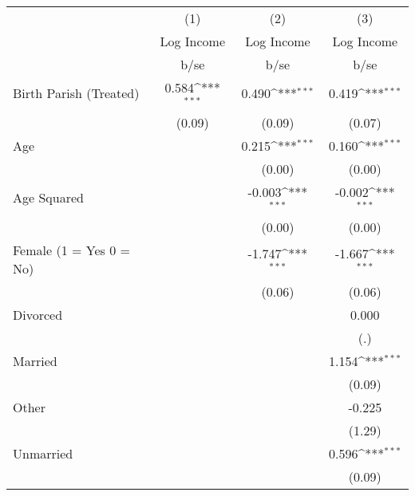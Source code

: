 {
\def\sym#1{\ifmmode^{#1}\else\(^{#1}\)\fi}
\begin{tabular}{l*{3}{c}}
\hline\hline
                    &\multicolumn{1}{c}{(1)}&\multicolumn{1}{c}{(2)}&\multicolumn{1}{c}{(3)}\\
                    &\multicolumn{1}{c}{Log Income}&\multicolumn{1}{c}{Log Income}&\multicolumn{1}{c}{Log Income}\\
                    &        b/se         &        b/se         &        b/se         \\
\hline
Birth Parish (Treated)&       0.584\sym{***}&       0.490\sym{***}&       0.419\sym{***}\\
                    &      (0.09)         &      (0.09)         &      (0.07)         \\
Age                 &                     &       0.215\sym{***}&       0.160\sym{***}\\
                    &                     &      (0.00)         &      (0.00)         \\
Age Squared         &                     &      -0.003\sym{***}&      -0.002\sym{***}\\
                    &                     &      (0.00)         &      (0.00)         \\
Female (1 = Yes 0 = No)&                     &      -1.747\sym{***}&      -1.667\sym{***}\\
                    &                     &      (0.06)         &      (0.06)         \\
Divorced            &                     &                     &       0.000         \\
                    &                     &                     &         (.)         \\
Married             &                     &                     &       1.154\sym{***}\\
                    &                     &                     &      (0.09)         \\
Other               &                     &                     &      -0.225         \\
                    &                     &                     &      (1.29)         \\
Unmarried           &                     &                     &       0.596\sym{***}\\
                    &                     &                     &      (0.09)         \\

\end{tabular}}
